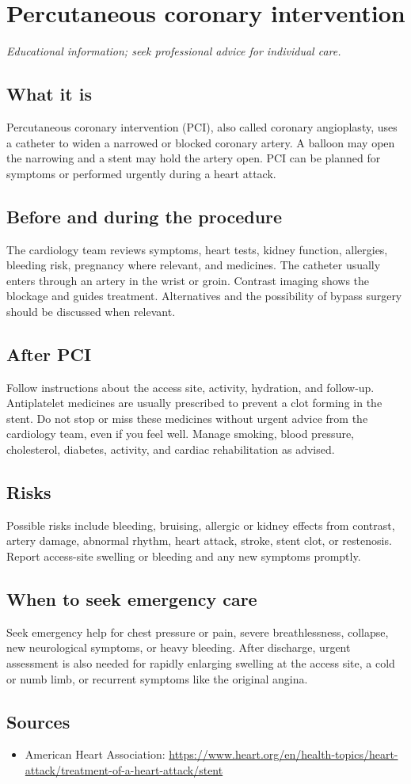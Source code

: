 \chapter{Percutaneous coronary intervention}

\medskip
\noindent\textit{Educational information; seek professional advice for individual care.}

\section*{What it is}
Percutaneous coronary intervention (PCI), also called coronary angioplasty, uses a catheter to widen a narrowed or blocked coronary artery. A balloon may open the narrowing and a stent may hold the artery open. PCI can be planned for symptoms or performed urgently during a heart attack.

\section*{Before and during the procedure}
The cardiology team reviews symptoms, heart tests, kidney function, allergies, bleeding risk, pregnancy where relevant, and medicines. The catheter usually enters through an artery in the wrist or groin. Contrast imaging shows the blockage and guides treatment. Alternatives and the possibility of bypass surgery should be discussed when relevant.

\section*{After PCI}
Follow instructions about the access site, activity, hydration, and follow-up. Antiplatelet medicines are usually prescribed to prevent a clot forming in the stent. Do not stop or miss these medicines without urgent advice from the cardiology team, even if you feel well. Manage smoking, blood pressure, cholesterol, diabetes, activity, and cardiac rehabilitation as advised.

\section*{Risks}
Possible risks include bleeding, bruising, allergic or kidney effects from contrast, artery damage, abnormal rhythm, heart attack, stroke, stent clot, or restenosis. Report access-site swelling or bleeding and any new symptoms promptly.

\section*{When to seek emergency care}
Seek emergency help for chest pressure or pain, severe breathlessness, collapse, new neurological symptoms, or heavy bleeding. After discharge, urgent assessment is also needed for rapidly enlarging swelling at the access site, a cold or numb limb, or recurrent symptoms like the original angina.

\section*{Sources}
\begin{itemize}
\item American Heart Association: \url{https://www.heart.org/en/health-topics/heart-attack/treatment-of-a-heart-attack/stent}
\end{itemize}
